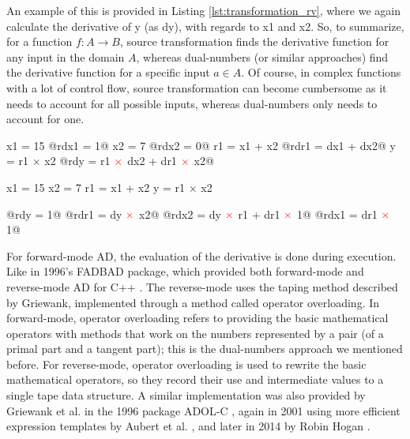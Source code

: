         An example of this is provided in Listing \ref{lst:transformation_rv}, where we again calculate the derivative of y (as dy), with regards to x1 and x2.
        So, to summarize, for a function $f:A\to B$, source transformation finds the derivative function for any input in the domain $A$, whereas dual-numbers (or similar approaches) find the derivative function for a specific input $a\in A$.
        Of course, in complex functions with a lot of control flow, source transformation can become cumbersome as it needs to account for all possible inputs, whereas dual-numbers only needs to account for one.

        \begin{quicklst}[caption={An example of forward mode AD by source transformation, with the AD statements in red}, label=lst:transformation_fw, gobble=12]
             x1 = 15
            @rdx1 = 1@
             x2 = 7
            @rdx2 = 0@
             r1 = x1 + x2
            @rdr1 = dx1 + dx2@
             y  = r1 $\times$ x2
            @rdy  = r1 $\color{red}\times$ dx2 + dr1 $\color{red}\times$ x2@
        \end{quicklst}

        \begin{quicklst}[caption={An example of reverse mode AD by source transformation, with the AD statements in red}, label=lst:transformation_rv, gobble=12]
             x1 = 15
             x2 = 7
             r1 = x1 + x2
             y  = r1 $\times$ x2

            @rdy  = 1@
            @rdr1 = dy $\color{red}\times$ x2@
            @rdx2 = dy $\color{red}\times$ r1 + dr1 $\color{red}\times$ 1@
            @rdx1 = dr1 $\color{red}\times$ 1@
        \end{quicklst}
        
        For forward-mode AD, the evaluation of the derivative is done during execution.
        Like in 1996's FADBAD package, which provided both forward-mode and reverse-mode AD for C++ \cite{bendtsen1996fadbad}.
        The reverse-mode uses the taping method described by Griewank, implemented through a method called operator overloading.
        In forward-mode, operator overloading refers to providing the basic mathematical operators with methods that work on the numbers represented by a pair (of a primal part and a tangent part); this is the dual-numbers approach we mentioned before.
        For reverse-mode, operator overloading is used to rewrite the basic mathematical operators, so they record their use and intermediate values to a single tape data structure.
        A similar implementation was also provided by Griewank et al. in the 1996 package ADOL-C \cite{griewank1996algorithm}, again in 2001 using more efficient expression templates by Aubert et al. \cite{aubert2001automatic}, and later in 2014 by Robin Hogan \cite{hogan2014fast}.

